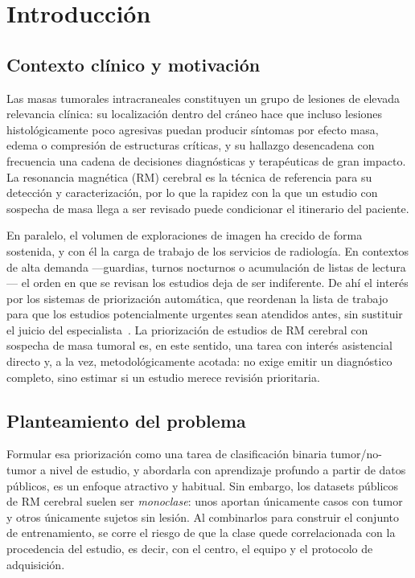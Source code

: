 \chapter{Introducción}

\section{Contexto clínico y motivación}

Las masas tumorales intracraneales constituyen un grupo de lesiones de elevada
relevancia clínica: su localización dentro del cráneo hace que incluso lesiones
histológicamente poco agresivas puedan producir síntomas por efecto masa, edema o
compresión de estructuras críticas, y su hallazgo desencadena con frecuencia una
cadena de decisiones diagnósticas y terapéuticas de gran impacto. La resonancia
magnética (RM) cerebral es la técnica de referencia para su detección y
caracterización, por lo que la rapidez con la que un estudio con sospecha de masa
llega a ser revisado puede condicionar el itinerario del paciente.

En paralelo, el volumen de exploraciones de imagen ha crecido de forma sostenida,
y con él la carga de trabajo de los servicios de radiología. En contextos de alta
demanda ---guardias, turnos nocturnos o acumulación de listas de lectura--- el
orden en que se revisan los estudios deja de ser indiferente. De ahí el interés
por los sistemas de priorización automática, que reordenan la lista de trabajo
para que los estudios potencialmente urgentes sean atendidos antes, sin sustituir
el juicio del especialista~\cite{titano2018cranial}. La priorización de estudios
de RM cerebral con sospecha de masa tumoral es, en este sentido, una tarea con
interés asistencial directo y, a la vez, metodológicamente acotada: no exige
emitir un diagnóstico completo, sino estimar si un estudio merece revisión
prioritaria.

\section{Planteamiento del problema}

Formular esa priorización como una tarea de clasificación binaria
tumor/no-tumor a nivel de estudio, y abordarla con aprendizaje profundo a partir
de datos públicos, es un enfoque atractivo y habitual. Sin embargo, los datasets
públicos de RM cerebral suelen ser \emph{monoclase}: unos aportan únicamente
casos con tumor y otros únicamente sujetos sin lesión. Al combinarlos para
construir el conjunto de entrenamiento, se corre el riesgo de que la clase quede
correlacionada con la procedencia del estudio, es decir, con el centro, el equipo
y el protocolo de adquisición.

